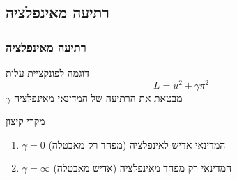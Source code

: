\documentclass[usenames,dvipsnames]{beamer}
\begin{document}
\begin{RTL}
\section{רתיעה מאינפלציה}
\begin{frame}
    \frametitle{רתיעה מאינפלציה}
    \begin{block}{דוגמה לפונקציית עלות}
        $$L = u^2 + \gamma \pi^2$$
        $\gamma$ מבטאת את הרתיעה של המדינאי מאינפלציה
    \end{block}
    \begin{alertblock}{מקרי קיצון}
        \begin{enumerate}
            \item $\gamma = 0$ המדינאי אדיש לאינפלציה (מפחד רק מאבטלה)
            \item $\gamma = \infty$ המדינאי רק מפחד מאינפלציה (אדיש מאבטלה)
        \end{enumerate}
    \end{alertblock}
\end{frame}
\end{RTL}
\end{document}

